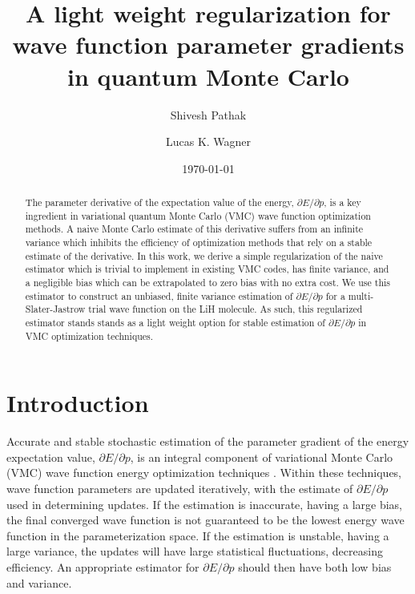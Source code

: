 \documentclass[twocolumn]{revtex4-1}
\begin{document}
\title{A light weight regularization for wave function parameter gradients
\\ in quantum Monte Carlo}

\author{Shivesh Pathak}

\author{Lucas K. Wagner}

\date{\today}
\begin{abstract}
The parameter derivative of the expectation value of the energy, $\partial E/\partial p$, is a key ingredient in variational quantum Monte Carlo (VMC) wave function optimization methods.
A naive Monte Carlo estimate of this derivative suffers from an infinite variance which inhibits the efficiency of optimization methods that rely on a stable estimate of the derivative.
In this work, we derive a simple regularization of the naive estimator which is trivial to implement in existing VMC codes, has finite variance, and a negligible bias which can be extrapolated to zero bias with no extra cost.
We use this estimator to construct an unbiased, finite variance estimation of $\partial E/\partial p$ for a multi-Slater-Jastrow trial wave function on the LiH molecule.
As such, this regularized estimator stands stands as a light weight option for stable estimation of $\partial E/\partial p$ in VMC optimization techniques.
\end{abstract}
\maketitle 

\section{Introduction}
Accurate and stable stochastic estimation of the parameter gradient of the energy expectation value, $\partial E/\partial p$, is an integral component of variational Monte Carlo (VMC) wave function energy optimization techniques \cite{PhysRevB.64.024512, doi:10.1063/1.1604379, Toulouse2007}.
Within these techniques, wave function parameters are updated iteratively, with the estimate of $\partial E/\partial p$ used in determining updates.
If the estimation is inaccurate, having a large bias, the final converged wave function is not guaranteed to be the lowest energy wave function in the parameterization space.
If the estimation is unstable, having a large variance, the updates will have large statistical fluctuations, decreasing efficiency.
An appropriate estimator for $\partial E/ \partial p$ should then have both low bias and variance.
\end{document}
